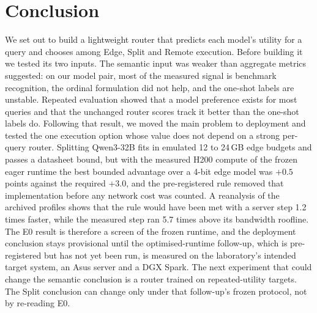 \documentclass[lettersize,journal]{IEEEtran}
\begin{document}
\section{Conclusion}
\label{sec:conclusion}
We set out to build a lightweight router that predicts each model's utility for a query and chooses among Edge, Split and Remote execution. Before building it we tested its two inputs. The semantic input was weaker than aggregate metrics suggested: on our model pair, most of the measured signal is benchmark recognition, the ordinal formulation did not help, and the one-shot labels are unstable. Repeated evaluation showed that a model preference exists for most queries and that the unchanged router scores track it better than the one-shot labels do. Following that result, we moved the main problem to deployment and tested the one execution option whose value does not depend on a strong per-query router. Splitting Qwen3-32B fits in emulated 12 to 24\,GB edge budgets and passes a datasheet bound, but with the measured H200 compute of the frozen eager runtime the best bounded advantage over a 4-bit edge model was $+0.5$ points against the required $+3.0$, and the pre-registered rule removed that implementation before any network cost was counted. A reanalysis of the archived profiles shows that the rule would have been met with a server step 1.2 times faster, while the measured step ran 5.7 times above its bandwidth roofline. The E0 result is therefore a screen of the frozen runtime, and the deployment conclusion stays provisional until the optimised-runtime follow-up, which is pre-registered but has not yet been run, is measured on the laboratory's intended target system, an Asus server and a DGX Spark. The next experiment that could change the semantic conclusion is a router trained on repeated-utility targets. The Split conclusion can change only under that follow-up's frozen protocol, not by re-reading E0.
\end{document}
